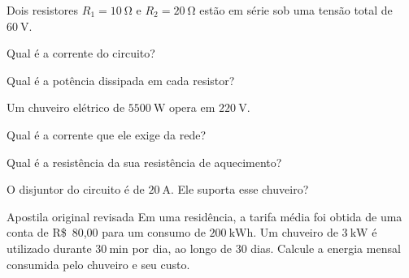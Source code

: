 \begin{questao}[2]{}
Dois resistores $R_1 = \SI{10}{\ohm}$ e $R_2 = \SI{20}{\ohm}$ estão em série sob
uma tensão total de $\SI{60}{\volt}$.
\begin{itensq}
\item Qual é a corrente do circuito?
\item Qual é a potência dissipada em cada resistor?
\end{itensq}
\end{questao}

\begin{questao}[2]{}
Um chuveiro elétrico de $\SI{5500}{\watt}$ opera em $\SI{220}{\volt}$.
\begin{itensq}
\item Qual é a corrente que ele exige da rede?
\item Qual é a resistência da sua resistência de aquecimento?
\item O disjuntor do circuito é de $\SI{20}{\ampere}$. Ele suporta esse chuveiro?
\end{itensq}
\end{questao}

\begin{questao}[2]{Apostila original revisada}
Em uma residência, a tarifa média foi obtida de uma conta de
R\$~80,00 para um consumo de $\SI{200}{\kilo\watt\hour}$. Um chuveiro de
$\SI{3}{\kilo\watt}$ é utilizado durante $\SI{30}{\minute}$ por dia, ao longo de
30 dias. Calcule a energia mensal consumida pelo chuveiro e seu custo.
\end{questao}


